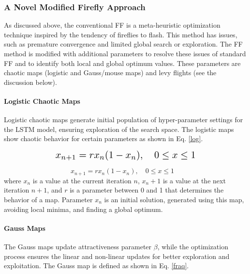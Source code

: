 \documentclass[journal]{IEEEtran}
\begin{document}
\subsubsection{A Novel Modified Firefly Approach}

As discussed above, the conventional FF is a meta-heuristic optimization technique inspired by the tendency of fireflies to flash. This method has issues, such as premature convergence and limited global search or exploration. The FF method is modified with additional parameters to resolve these issues of standard FF and to identify both local and global optimum values. These parameters are chaotic maps (logistic and Gauss/mouse maps) and levy flights (see the discussion below). 

\paragraph{Logistic Chaotic Maps}
Logistic chaotic maps generate initial population of hyper-parameter settings for the LSTM model, ensuring exploration of the search space. The logistic maps show chaotic behavior for certain parameters as shown in Eq. \eqref{log}.

\textcolor{red}{
\begin{equation}\label{log}
    \resizebox{0.6\columnwidth}{!}{$x_{n+1} = r x_n (1 - x_n), \quad 0 \leq x \leq 1$}
\end{equation}}



\begin{equation}\label{log}
    x_{n+1} = r x_n (1 - x_n), \quad 0 \leq x \leq 1 \quad 
\end{equation}
where \(x_n\) is a value at the current iteration \(n\), \(x_n+1\) is a value at the next iteration \(n+1\), and \(r\) is a parameter between 0 and 1 that determines the behavior of a map. Parameter \(x_n\) is an initial solution, generated using this map, avoiding local minima, and finding a global optimum.




\paragraph{Gauss Maps}
The Gauss maps update attractiveness parameter $\beta$, while the optimization process ensures the linear and non-linear updates for better exploration and exploitation. The Gauss map is defined as shown in Eq. \eqref{fraq}. 
\end{document}
